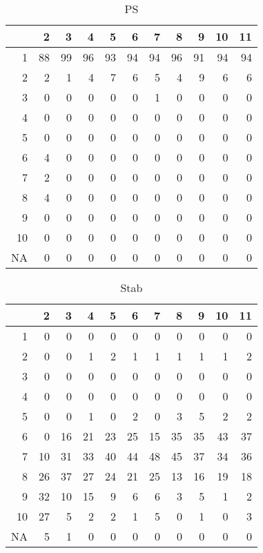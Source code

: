 \documentclass[11pt]{article}
\begin{document}
\begin{table}[H]
\centering
\begin{tabular}{rrrrrrrrrrr}
  \hline
 & 2 & 3 & 4 & 5 & 6 & 7 & 8 & 9 & 10 & 11 \\ 
  \hline
1 & 88 & 99 & 96 & 93 & 94 & 94 & 96 & 91 & 94 & 94 \\ 
  2 & 2 & 1 & 4 & 7 & 6 & 5 & 4 & 9 & 6 & 6 \\ 
  3 & 0 & 0 & 0 & 0 & 0 & 1 & 0 & 0 & 0 & 0 \\ 
  4 & 0 & 0 & 0 & 0 & 0 & 0 & 0 & 0 & 0 & 0 \\ 
  5 & 0 & 0 & 0 & 0 & 0 & 0 & 0 & 0 & 0 & 0 \\ 
  6 & 4 & 0 & 0 & 0 & 0 & 0 & 0 & 0 & 0 & 0 \\ 
  7 & 2 & 0 & 0 & 0 & 0 & 0 & 0 & 0 & 0 & 0 \\ 
  8 & 4 & 0 & 0 & 0 & 0 & 0 & 0 & 0 & 0 & 0 \\ 
  9 & 0 & 0 & 0 & 0 & 0 & 0 & 0 & 0 & 0 & 0 \\ 
  10 & 0 & 0 & 0 & 0 & 0 & 0 & 0 & 0 & 0 & 0 \\ 
  NA & 0 & 0 & 0 & 0 & 0 & 0 & 0 & 0 & 0 & 0 \\ 
   \hline
\end{tabular}
\caption{PS} 
\end{table}
\begin{table}[H]
\centering
\begin{tabular}{rrrrrrrrrrr}
  \hline
 & 2 & 3 & 4 & 5 & 6 & 7 & 8 & 9 & 10 & 11 \\ 
  \hline
1 & 0 & 0 & 0 & 0 & 0 & 0 & 0 & 0 & 0 & 0 \\ 
  2 & 0 & 0 & 1 & 2 & 1 & 1 & 1 & 1 & 1 & 2 \\ 
  3 & 0 & 0 & 0 & 0 & 0 & 0 & 0 & 0 & 0 & 0 \\ 
  4 & 0 & 0 & 0 & 0 & 0 & 0 & 0 & 0 & 0 & 0 \\ 
  5 & 0 & 0 & 1 & 0 & 2 & 0 & 3 & 5 & 2 & 2 \\ 
  6 & 0 & 16 & 21 & 23 & 25 & 15 & 35 & 35 & 43 & 37 \\ 
  7 & 10 & 31 & 33 & 40 & 44 & 48 & 45 & 37 & 34 & 36 \\ 
  8 & 26 & 37 & 27 & 24 & 21 & 25 & 13 & 16 & 19 & 18 \\ 
  9 & 32 & 10 & 15 & 9 & 6 & 6 & 3 & 5 & 1 & 2 \\ 
  10 & 27 & 5 & 2 & 2 & 1 & 5 & 0 & 1 & 0 & 3 \\ 
  NA & 5 & 1 & 0 & 0 & 0 & 0 & 0 & 0 & 0 & 0 \\ 
   \hline
\end{tabular}
\caption{Stab} 
\end{table}






\end{document}
